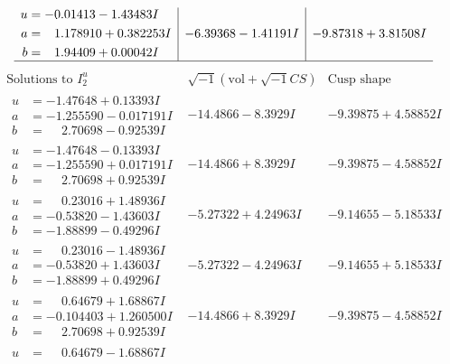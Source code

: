 \documentclass[1p]{elsarticle_modified}
\theoremstyle{definition}
\newcommand{\I}{\sqrt{-1}}
\begin{document}
$$\begin{array}{c|c|c}
\begin{aligned}
u &= -0.01413 - 1.43483 I \\
a &= \phantom{-}1.178910 + 0.382253 I \\
b &= \phantom{-}1.94409 + 0.00042 I\end{aligned}
 & -6.39368 - 1.41191 I & -9.87318 + 3.81508 I\\
 \hline 
 \end{array}$$\newpage$$\begin{array}{c|c|c}  
\text{Solutions to }I^u_{2}& \I (\text{vol} + \sqrt{-1}CS) & \text{Cusp shape}\\
 \hline 
\begin{aligned}
u &= -1.47648 + 0.13393 I \\
a &= -1.255590 - 0.017191 I \\
b &= \phantom{-}2.70698 - 0.92539 I\end{aligned}
 & -14.4866 - 8.3929 I & -9.39875 + 4.58852 I \\ \hline\begin{aligned}
u &= -1.47648 - 0.13393 I \\
a &= -1.255590 + 0.017191 I \\
b &= \phantom{-}2.70698 + 0.92539 I\end{aligned}
 & -14.4866 + 8.3929 I & -9.39875 - 4.58852 I \\ \hline\begin{aligned}
u &= \phantom{-}0.23016 + 1.48936 I \\
a &= -0.53820 - 1.43603 I \\
b &= -1.88899 - 0.49296 I\end{aligned}
 & -5.27322 + 4.24963 I & -9.14655 - 5.18533 I \\ \hline\begin{aligned}
u &= \phantom{-}0.23016 - 1.48936 I \\
a &= -0.53820 + 1.43603 I \\
b &= -1.88899 + 0.49296 I\end{aligned}
 & -5.27322 - 4.24963 I & -9.14655 + 5.18533 I \\ \hline\begin{aligned}
u &= \phantom{-}0.64679 + 1.68867 I \\
a &= -0.104403 + 1.260500 I \\
b &= \phantom{-}2.70698 + 0.92539 I\end{aligned}
 & -14.4866 + 8.3929 I & -9.39875 - 4.58852 I \\ \hline\begin{aligned}
u &= \phantom{-}0.64679 - 1.68867 I \\

\end{aligned}
\end{array}$$
\end{document}
